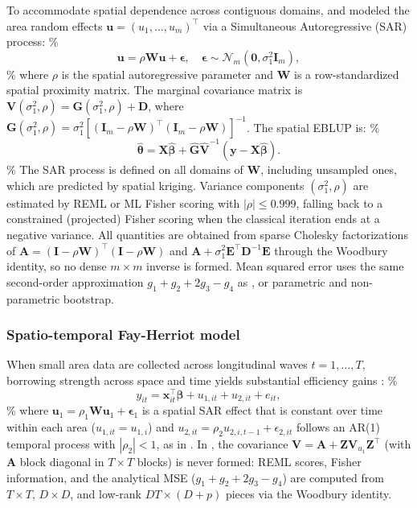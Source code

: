 To accommodate spatial dependence across contiguous domains, \citet{petrucci2006small} and \citet{pratesi2008small} modeled the area random effects \(\bm{u} = (u_1, \dots, u_m)^\top\) via a Simultaneous Autoregressive (SAR) process:
\%
\begin{equation} \label{eq:sfh_sar}
\bm{u} = \rho \bm{W} \bm{u} + \bm{\epsilon}, \quad \bm{\epsilon} \sim \mathcal{N}_m(\bm{0}, \sigma_1^2 \bm{I}_m),
\end{equation}
\%
where \(\rho\) is the spatial autoregressive parameter and \(\bm{W}\) is a row-standardized spatial proximity matrix. The marginal covariance matrix is \(\bm{V}(\sigma_1^2, \rho) = \bm{G}(\sigma_1^2, \rho) + \bm{D}\), where \(\bm{G}(\sigma_1^2, \rho) = \sigma_1^2 [(\bm{I}_m - \rho \bm{W})^\top (\bm{I}_m - \rho \bm{W})]^{-1}\). The spatial EBLUP is:
\%
\begin{equation} \label{eq:sfh_eblup}
\hat{\bm{\theta}} = \bm{X} \hat{\bm{\beta}} + \hat{\bm{G}} \hat{\bm{V}}^{-1} (\bm{y} - \bm{X} \hat{\bm{\beta}}).
\end{equation}
\%
The SAR process is defined on all domains of \(\bm{W}\), including unsampled ones, which are predicted by spatial kriging. Variance components \((\sigma_1^2, \rho)\) are estimated by REML or ML Fisher scoring with \(|\rho| \le 0.999\), falling back to a constrained (projected) Fisher scoring when the classical iteration ends at a negative variance. All quantities are obtained from sparse Cholesky factorizations of \(\bm{A} = (\bm{I} - \rho\bm{W})^\top(\bm{I} - \rho\bm{W})\) and \(\bm{A} + \sigma_1^2 \bm{E}^\top \bm{D}^{-1} \bm{E}\) through the Woodbury identity, so no dense \(m \times m\) inverse is formed. Mean squared error uses the same second-order approximation \(g_1 + g_2 + 2g_3 - g_4\) as  \citep{molina2015sae}, or parametric and non-parametric bootstrap.

\subsubsection{Spatio-temporal Fay-Herriot model}

When small area data are collected across longitudinal waves \(t = 1, \dots, T\), borrowing strength across space and time yields substantial efficiency gains \citep{marhuenda2013small}:
\%
\begin{equation} \label{eq:stfh_model}
y_{it} = \bm{x}_{it}^\top \bm{\beta} + u_{1,it} + u_{2,it} + e_{it},
\end{equation}
\%
where \(\bm{u}_1 = \rho_1 \bm{W} \bm{u}_1 + \bm{\epsilon}_1\) is a spatial SAR effect that is constant over time within each area (\(u_{1,it} = u_{1,i}\)) and \(u_{2,it} = \rho_2 u_{2,i,t-1} + \epsilon_{2,it}\) follows an AR(1) temporal process with \(|\rho_2| < 1\), as in \citet{marhuenda2013small}. In , the covariance \(\bm{V} = \bm{A} + \bm{Z}\bm{V}_{u_1}\bm{Z}^\top\) (with \(\bm{A}\) block diagonal in \(T \times T\) blocks) is never formed: REML scores, Fisher information, and the analytical MSE (\(g_1 + g_2 + 2g_3 - g_4\)) are computed from \(T \times T\), \(D \times D\), and low-rank \(DT \times (D + p)\) pieces via the Woodbury identity.

